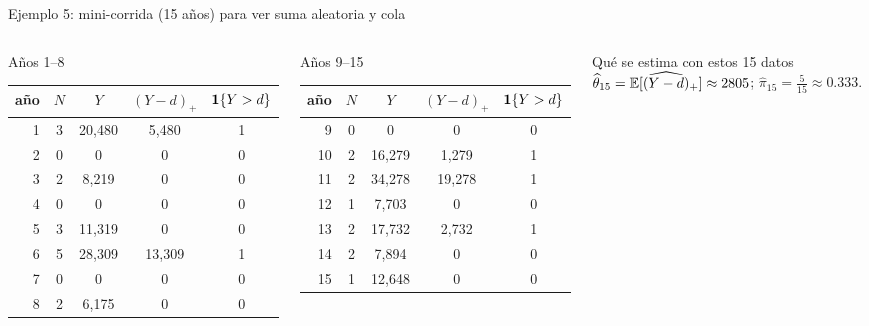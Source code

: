 \documentclass[aspectratio=1610, 9pt]{beamer}
\begin{document}
\begin{frame}{Ejemplo 5: mini-corrida (15 años) para ver suma aleatoria y cola}
\scriptsize
\begin{columns}[T]
\begin{block}{Años 1--8}
\centering
\setlength{\tabcolsep}{4pt}
\begin{tabular}{@{}rcccc@{}}
\toprule
año & $N$ & $Y$ & $(Y-d)_+$ & $\mathbf{1}\{Y>d\}$ \\
\midrule
1 & 3 & 20,480 & 5,480 & 1 \\
2 & 0 & 0 & 0 & 0 \\
3 & 2 & 8,219 & 0 & 0 \\
4 & 0 & 0 & 0 & 0 \\
5 & 3 & 11,319 & 0 & 0 \\
6 & 5 & 28,309 & 13,309 & 1 \\
7 & 0 & 0 & 0 & 0 \\
8 & 2 & 6,175 & 0 & 0 \\
\bottomrule
\end{tabular}
\end{block}

\begin{block}{Años 9--15}
\centering
\setlength{\tabcolsep}{4pt}
\begin{tabular}{@{}rcccc@{}}
\toprule
año & $N$ & $Y$ & $(Y-d)_+$ & $\mathbf{1}\{Y>d\}$ \\
\midrule
9 & 0 & 0 & 0 & 0 \\
10 & 2 & 16,279 & 1,279 & 1 \\
11 & 2 & 34,278 & 19,278 & 1 \\
12 & 1 & 7,703 & 0 & 0 \\
13 & 2 & 17,732 & 2,732 & 1 \\
14 & 2 & 7,894 & 0 & 0 \\
15 & 1 & 12,648 & 0 & 0 \\
\bottomrule
\end{tabular}
\end{block}

\begin{alertblock}{Qué se estima con estos 15 datos}
$\widehat{\theta}_{15}=\widehat{\mathbb{E}[(Y-d)_+]}\approx 2805$;\quad
$\widehat{\pi}_{15}=\frac{5}{15}\approx 0.333$.
\end{alertblock}
\end{columns}
\end{frame}
\end{document}
